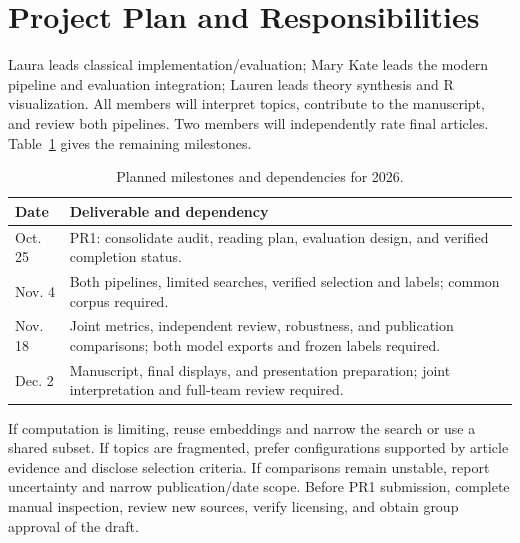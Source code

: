 \documentclass[conference]{IEEEtran}
\begin{document}
\section{Project Plan and Responsibilities}
Laura leads classical implementation/evaluation; Mary Kate leads the modern pipeline and evaluation integration; Lauren leads theory synthesis and R visualization. All members will interpret topics, contribute to the manuscript, and review both pipelines. Two members will independently rate final articles. Table~\ref{tab:plan} gives the remaining milestones.

\begin{table}[t]
\caption{Planned milestones and dependencies for 2026.}
\label{tab:plan}
\centering
\begin{tabular}{@{}p{}p{}@{}}
\toprule
Date & Deliverable and dependency \\
\midrule
Oct. 25 & PR1: consolidate audit, reading plan, evaluation design, and verified completion status. \\
Nov. 4 & Both pipelines, limited searches, verified selection and labels; common corpus required. \\
Nov. 18 & Joint metrics, independent review, robustness, and publication comparisons; both model exports and frozen labels required. \\
Dec. 2 & Manuscript, final displays, and presentation preparation; joint interpretation and full-team review required. \\
\bottomrule
\end{tabular}
\end{table}

If computation is limiting, reuse embeddings and narrow the search or use a shared subset. If topics are fragmented, prefer configurations supported by article evidence and disclose selection criteria. If comparisons remain unstable, report uncertainty and narrow publication/date scope. Before PR1 submission, complete manual inspection, review new sources, verify licensing, and obtain group approval of the draft.

\clearpage
{}


\end{document}
